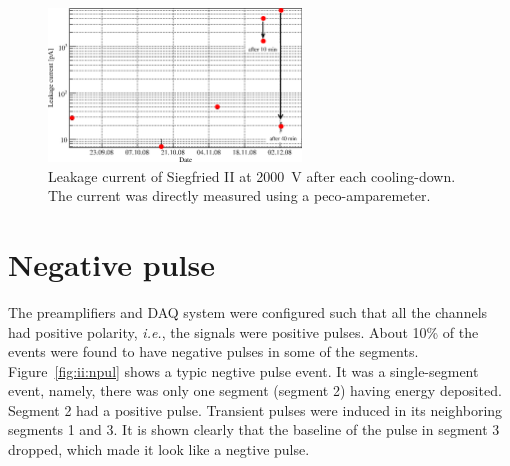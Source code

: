 \begin{figure}[htbp]
\centering
\includegraphics[width=0.6\textwidth, clip]{LCs2}
\caption{Leakage current of Siegfried II at 2000~V after each cooling-down. The current was directly measured using a peco-amparemeter.}
\label{fig:ii:lcs2}
\end{figure}



\section{Negative pulse}
\label{sec:ii:npulse}
The preamplifiers and DAQ system were configured such that all the channels had positive polarity, \textit{i.e.}, the signals were positive pulses. About 10\% of the events were found to have negative pulses in some of the segments. Figure~\ref{fig:ii:npul} shows a typic negtive pulse event. It was a single-segment event, namely, there was only one segment (segment 2) having energy deposited. Segment 2 had a positive pulse. Transient pulses were induced in its neighboring segments 1 and 3. It is shown clearly that the baseline of the pulse in segment 3 dropped, which made it look like a negtive pulse.

